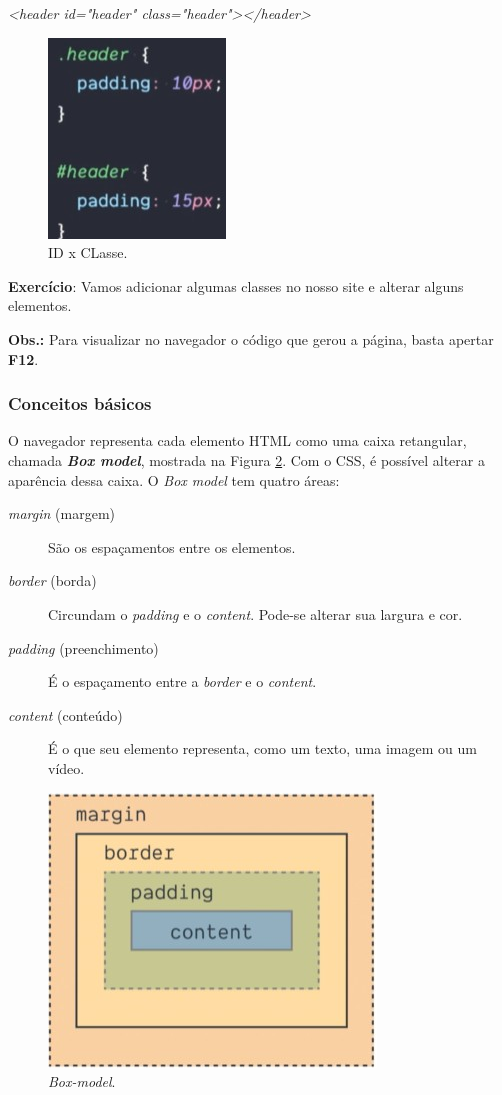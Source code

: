 \documentclass[12pt,a4paper]{article}
\begin{document}
	\textit{<header id="header" class="header"></header>}

	\begin{figure}[tbph!]
		\centering
		\includegraphics[width=0.3\linewidth]{images/id-classe}
		\caption{ID x CLasse.}
		\label{fig:id-x-classe}
	\end{figure}

	\textbf{Exercício}: Vamos adicionar algumas classes no nosso site e alterar alguns elementos.
	
	\textbf{Obs.:} Para visualizar no navegador o código que gerou a página, basta apertar \textbf{F12}.
	
	\subsubsection{Conceitos básicos}
	
	O navegador representa cada elemento HTML como uma caixa retangular, chamada \textbf{\textit{Box model}}, mostrada na Figura \ref{fig:box-model}. Com o CSS, é possível alterar a aparência dessa caixa. O \textit{Box model} tem quatro áreas:
	
	\begin{description}
		\item[\textit{margin} (margem)] São os espaçamentos entre os elementos.
		\item[\textit{border} (borda)] Circundam o \textit{padding} e o \textit{content}. Pode-se alterar sua largura e cor.
		\item[\textit{padding} (preenchimento)] É o espaçamento entre a \textit{border} e o \textit{content}. 
		\item[\textit{content} (conteúdo)] É o que seu elemento representa, como um texto, uma imagem ou um vídeo.
	\end{description}
	
	\begin{figure}[tbph!]
		\centering
		\includegraphics[width=0.3\linewidth]{images/box-model}
		\caption{\textit{Box-model}.}
		\label{fig:box-model}
	\end{figure}
\end{document}

